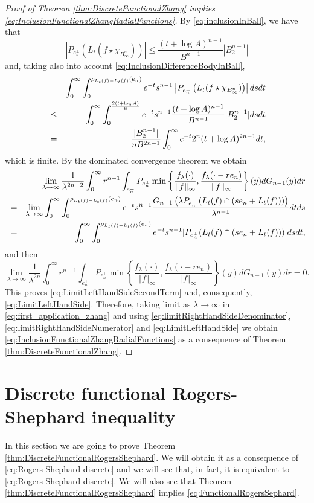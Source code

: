 \documentclass{amsart}
\theoremstyle{remark}
\theoremstyle{definition}
\numberwithin{equation}{section}
\begin{document}
\begin{proof}[Proof of Theorem \ref{thm:DiscreteFunctionalZhang} implies \eqref{eq:InclusionFunctionalZhangRadialFunctions}]
By \eqref{eq:inclusionInBall}, we have that
$$
\left|P_{e_n^\perp}\left(L_t(f\star\chi_{B_\infty^n})\right)\right|\leq\frac{(t+\log A)^{n-1}}{B^{n-1}}|B_2^{n-1}|
$$
and, taking also into account \eqref{eq:InclusionDifferenceBodyInBall},
\begin{eqnarray*}
&&\int_0^\infty \int_0^{\rho_{L_t(f)-L_t(f)}(e_n)}e^{-t}s^{n-1}\left|P_{e_n^\perp}\left(L_t(f\star\chi_{B_\infty^n})\right)\right|dsdt\cr
&\leq&\int_0^\infty \int_0^{\frac{2(t+\log A)}{B}}e^{-t}s^{n-1}\frac{(t+\log A)^{n-1}}{B^{n-1}}|B_2^{n-1}|dsdt\cr
&=&\frac{|B_2^{n-1}|}{n B^{2n-1}}\int_0^\infty e^{-t}2^n(t+\log A)^{2n-1}dt,
\end{eqnarray*}
which is finite. By the dominated convergence theorem we obtain
\begin{eqnarray*}
&&\lim_{\lambda\to\infty}\frac{1}{\lambda^{2n-2}}\int_0^\infty r^{n-1}\int_{e_n^\perp}P_{e_n^\perp}\min\left\{\frac{f_\lambda(\cdot)}{\Vert f\Vert_\infty},\frac{f_\lambda(\cdot-re_n)}{\Vert f\Vert_\infty}\right\}(y)dG_{n-1}(y)dr\cr
&=&\lim_{\lambda\to\infty}\int_0^\infty \int_0^{\rho_{L_t(f)-L_t(f)}(e_n)}e^{-t}s^{n-1} \frac{G_{n-1}\left(\lambda P_{e_n^\perp}\left(L_t(f)\cap\left(se_n+ L_t(f)\right)\right)\right)}{\lambda^{n-1}}dtds\cr
&=&\int_0^\infty \int_0^{\rho_{L_t(f)-L_t(f)}(e_n)}e^{-t}s^{n-1}|P_{e_n^\perp}(L_t(f)\cap (se_n+L_t(f)))|dsdt,
\end{eqnarray*}
and then
$$
\lim_{\lambda\to\infty}\frac{1}{\lambda^{2n}}\int_0^\infty r^{n-1}\int_{e_n^\perp}P_{e_n^\perp}\min\left\{\frac{f_\lambda(\cdot)}{\Vert f\Vert_\infty},\frac{f_\lambda(\cdot-re_n)}{\Vert f\Vert_\infty}\right\}(y)dG_{n-1}(y)dr=0.
$$
This proves \eqref{eq:LimitLeftHandSideSecondTerm} and, consequently, \eqref{eq:LimitLeftHandSide}. Therefore, taking limit as $\lambda\to\infty$ in \eqref{eq:first_application_zhang} and using \eqref{eq:limitRightHandSideDenominator},\eqref{eq:limitRightHandSideNumerator} and \eqref{eq:LimitLeftHandSide} we obtain \eqref{eq:InclusionFunctionalZhangRadialFunctions} as a consequence of Theorem \ref{thm:DiscreteFunctionalZhang}.

\end{proof}


\section{Discrete functional Rogers-Shephard inequality}\label{sec:DiscreteFunctionalRogersShephard}

In this section we are going to prove Theorem \ref{thm:DiscreteFunctionalRogersShephard}. We will obtain it as a consequence of \eqref{eq:Rogers-Shephard discrete} and we will see that, in fact, it is equivalent to \eqref{eq:Rogers-Shephard discrete}. We will also see that Theorem \ref{thm:DiscreteFunctionalRogersShephard} implies \eqref{eq:FunctionalRogersSephard}.
\end{document}
